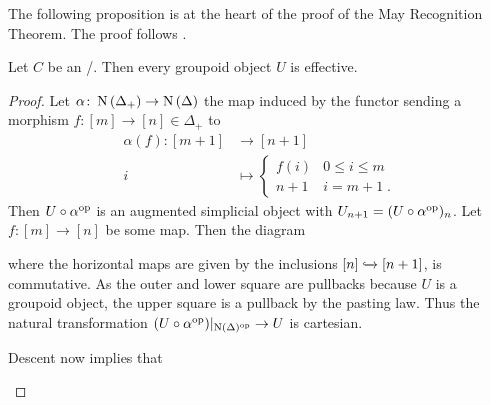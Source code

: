 The following proposition is at the heart of the proof of the May Recognition Theorem. 
The proof follows \cite[pp 29-30]{toposes_and_htpy_toposes}.
\begin{prop}\label{prop:groupoidObjInToposAreEffective}
    Let $C$ be an \inftytop/.
    Then every groupoid object $U$ is effective.
    \begin{proof}
        Let $\alpha\colon\operatorname{N}\left(\Delta_+\right)\to\operatorname{N}\left(\Delta\right)$ the map induced by the functor sending a morphism $f\colon [m]\to[n]\in\Delta_+$ to 
        \begin{align*}
            \alpha(f)\colon [m+1]&\to[n+1]\\
            i&\mapsto
            \begin{cases}
                f(i) & 0\leq i\leq m\\
                n+1 & i=m+1\;.
            \end{cases}
        \end{align*}
        Then $U\circ\alpha^{\operatorname{op}}$ is an augmented simplicial object with $U_{n+1}=(U\circ\alpha^{\operatorname{op}})_n$.
        Let $f\colon [m]\to[n]$ be some map. Then the diagram
        \begin{center}
        \end{center}
        where the horizontal maps are given by the inclusions $[n]\xhookrightarrow{}[n+1]$, is commutative. 
        As the outer and lower square are pullbacks because $U$ is a groupoid object, the upper square is a pullback by the pasting law.
        Thus the natural transformation $(U\circ\alpha^{\operatorname{op}})|_{\operatorname{N}(\Delta)^{\operatorname{op}}}\to U$ is cartesian.

        Descent now implies that 
        \begin{center}
\end{center}
\end{proof}
\end{prop}
